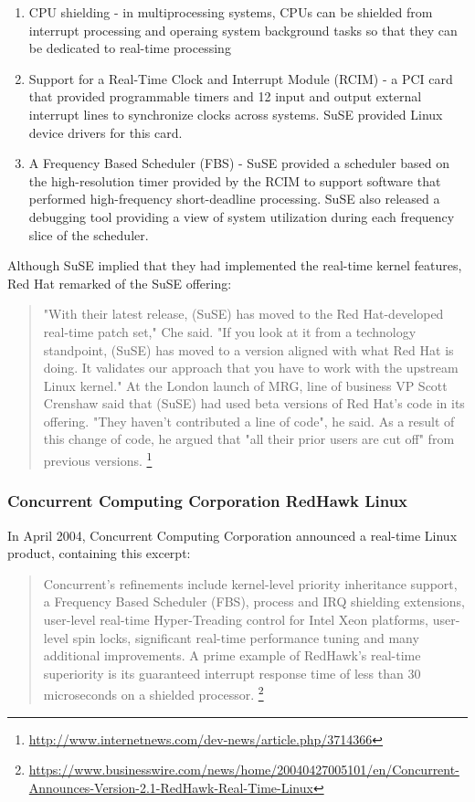 \documentclass[12pt]{article}
\begin{document}
\begin{enumerate}
\item CPU shielding - in multiprocessing systems, CPUs can be shielded from
interrupt processing and operaing system background tasks so that they can be
dedicated to real-time processing
\item Support for a Real-Time Clock and Interrupt Module (RCIM) - a PCI card
that provided programmable timers and 12 input and output external interrupt
lines to synchronize clocks across systems.  SuSE provided Linux device drivers
for this card.
\item A Frequency Based Scheduler (FBS) - SuSE provided a scheduler based on
the high-resolution timer provided by the RCIM to support software that
performed high-frequency short-deadline processing.  SuSE also released a
debugging tool providing a view of system utilization during each frequency
slice of the scheduler.
\end{enumerate}
\label{ref:suse_rt_features}

Although SuSE implied that they had implemented the real-time kernel features,
Red Hat remarked of the SuSE offering:

\begin{quote}
"With their latest release, (SuSE) has moved to the Red Hat-developed real-time
patch set," Che said. "If you look at it from a technology standpoint, (SuSE)
has moved to a version aligned with what Red Hat is doing. It validates our
approach that you have to work with the upstream Linux kernel." At the London
launch of MRG, line of business VP Scott Crenshaw said that (SuSE) had used beta
versions of Red Hat's code in its offering. "They haven't contributed a line of
code", he said. As a result of this change of code, he argued that "all their
prior users are cut off" from previous versions.%
\footnote{\url{http://www.internetnews.com/dev-news/article.php/3714366}}
\end{quote}


\subsubsection{Concurrent Computing Corporation RedHawk Linux}

In April 2004, Concurrent Computing Corporation announced a real-time
Linux product, containing this excerpt:

\begin{quote}
Concurrent's refinements include kernel-level priority inheritance support,
a Frequency Based Scheduler (FBS), process and IRQ shielding extensions,
user-level real-time Hyper-Treading control for Intel Xeon platforms,
user-level spin locks, significant real-time performance tuning and
many additional improvements. A prime example of RedHawk's real-time
superiority is its guaranteed interrupt response time of less than
30 microseconds on a shielded
processor.%
\footnote{\url{https://www.businesswire.com/news/home/20040427005101/en/Concurrent-Announces-Version-2.1-RedHawk-Real-Time-Linux}}
\end{quote}
\end{document}
